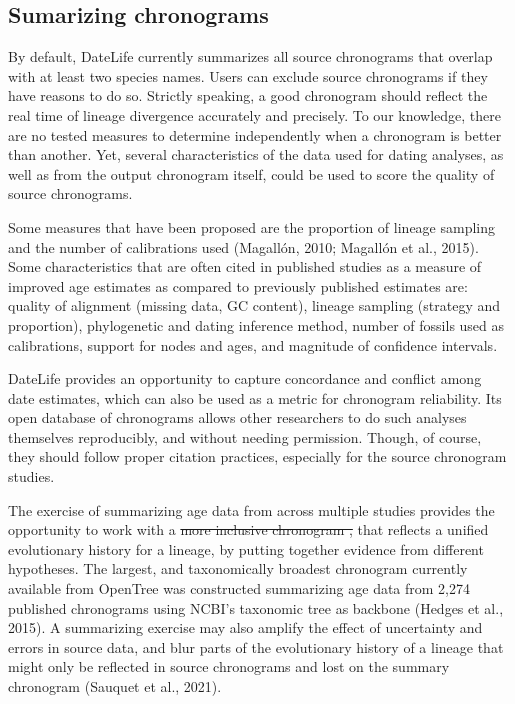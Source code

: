 \documentclass[english,man]{apa6}
\providecommand{\DIFaddtex}[1]{{\protect\color{blue}\uwave{#1}}} %
\providecommand{\DIFdeltex}[1]{{\protect\color{red}\sout{#1}}}                      %
\providecommand{\DIFaddbegin}{} %
\providecommand{\DIFaddend}{} %
\providecommand{\DIFdelbegin}{} %
\providecommand{\DIFdelend}{} %
\providecommand{\DIFadd}[1]{\texorpdfstring{\DIFaddtex{#1}}{#1}} %
\providecommand{\DIFdel}[1]{\texorpdfstring{\DIFdeltex{#1}}{}} %
\newcommand{\DIFscaledelfig}{0.5}
\newlength{\DIFdelgraphicswidth} %
\newlength{\DIFdelgraphicsheight} %
\newcommand{\DIFaddincludegraphics}[2][]{{\color{blue}\fbox{\DIFOincludegraphics[#1]{#2}}}} %
\newcommand{\DIFdelincludegraphics}[2][]{%
\sbox{\DIFdelgraphicsbox}{\DIFOincludegraphics[#1]{#2}}%
\settoboxwidth{\DIFdelgraphicswidth}{\DIFdelgraphicsbox} %
\settoboxtotalheight{\DIFdelgraphicsheight}{\DIFdelgraphicsbox} %
\scalebox{\DIFscaledelfig}{%
\parbox[b]{\DIFdelgraphicswidth}{\usebox{\DIFdelgraphicsbox}\\[-\baselineskip] \rule{\DIFdelgraphicswidth}{0em}}\llap{\resizebox{\DIFdelgraphicswidth}{\DIFdelgraphicsheight}{%
\setlength{\unitlength}{\DIFdelgraphicswidth}%
\begin{picture}(1,1)%
\thicklines\linethickness{2pt} %
{\color[rgb]{1,0,0}\put(0,0){\framebox(1,1){}}}%
{\color[rgb]{1,0,0}\put(0,0){\line( 1,1){1}}}%
{\color[rgb]{1,0,0}\put(0,1){\line(1,-1){1}}}%
\end{picture}%
}\hspace*{3pt}}} %
} %
\DeclareRobustCommand{\DIFaddbegin}{\DIFOaddbegin \let\includegraphics\DIFaddincludegraphics} %
\DeclareRobustCommand{\DIFaddend}{\DIFOaddend \let\includegraphics\DIFOincludegraphics} %
\DeclareRobustCommand{\DIFdelbegin}{\DIFOdelbegin \let\includegraphics\DIFdelincludegraphics} %
\DeclareRobustCommand{\DIFdelend}{\DIFOaddend \let\includegraphics\DIFOincludegraphics} %
\begin{document}
\hypertarget{sumarizing-chronograms}{%
\subsection{Sumarizing chronograms}\label{sumarizing-chronograms}}

By default, DateLife currently summarizes all source chronograms that overlap with at least two species names. Users can exclude source chronograms if they have reasons to do so.
Strictly speaking, a good chronogram should reflect the real time of lineage divergence accurately and precisely.
To our knowledge, there are no tested measures to determine independently when a chronogram is better than another. Yet, several characteristics of the data used for dating analyses, as well as from the output chronogram itself, could be used to score the quality of source chronograms.

Some measures that have been proposed are the proportion of lineage sampling and the number of calibrations used (Magallón, 2010; Magallón et al., 2015).
Some characteristics that are often cited in published studies as a measure of improved age estimates as compared to previously published estimates are: quality of alignment (missing data, GC content), lineage sampling (strategy and proportion), phylogenetic and dating inference method, number of fossils used as calibrations, support for nodes and ages, and magnitude of confidence intervals.

DateLife provides an opportunity to capture concordance and conflict among date estimates, which can also be used as a metric for chronogram reliability.
Its open database of chronograms allows other researchers to do such analyses themselves reproducibly, and without needing permission. Though, of course, they should follow proper citation practices, especially for the source chronogram studies.

The exercise of summarizing age data from across multiple studies provides the opportunity to work with a \DIFdelbegin \DIFdel{more inclusive chronogram ,
}\DIFdelend \DIFaddbegin \DIFadd{chronogram }\DIFaddend that reflects a unified evolutionary history for a lineage, by putting together evidence from different hypotheses.
The largest, and taxonomically broadest chronogram currently available from OpenTree was constructed summarizing age data from 2,274 published chronograms using NCBI's taxonomic tree as backbone (Hedges et al., 2015).
A summarizing exercise may also amplify the effect of uncertainty and errors in source data, and blur parts of the evolutionary history of a lineage that might only be reflected in source chronograms and lost on the summary chronogram (Sauquet et al., 2021).
\end{document}
